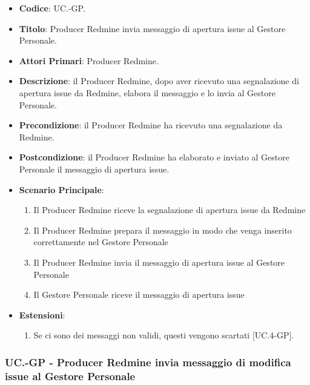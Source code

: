 	\begin{itemize}
		\item \textbf{Codice}: UC\theuccount.\thesubuccount-GP.
		\item \textbf{Titolo}: Producer Redmine invia messaggio di apertura issue al Gestore Personale.
		\item \textbf{Attori Primari}: Producer Redmine.
		\item \textbf{Descrizione}: il Producer Redmine, dopo aver
		ricevuto una segnalazione di apertura issue da Redmine, elabora il messaggio e lo invia al Gestore Personale.
		\item \textbf{Precondizione}: il Producer Redmine ha ricevuto una segnalazione da Redmine.
		\item \textbf{Postcondizione}: il Producer Redmine ha elaborato e inviato al Gestore Personale il messaggio di apertura issue.
		\item \textbf{Scenario Principale}:
		\begin{enumerate}
			\item Il Producer Redmine riceve la segnalazione di apertura issue da Redmine
			\item Il Producer Redmine prepara il messaggio in modo che venga inserito correttamente nel Gestore Personale
			\item Il Producer Redmine invia il messaggio di
			apertura issue al Gestore Personale
            \item Il Gestore Personale riceve il messaggio di apertura issue
		\end{enumerate}
		\item \textbf{Estensioni}:
		\begin{enumerate}
			\item Se ci sono dei messaggi non validi, questi vengono scartati [UC\theuccount.4-GP].
		\end{enumerate}
	\end{itemize}

	\subsubsection{UC\theuccount.\thesubuccount-GP - Producer Redmine invia messaggio di modifica issue al Gestore Personale}

